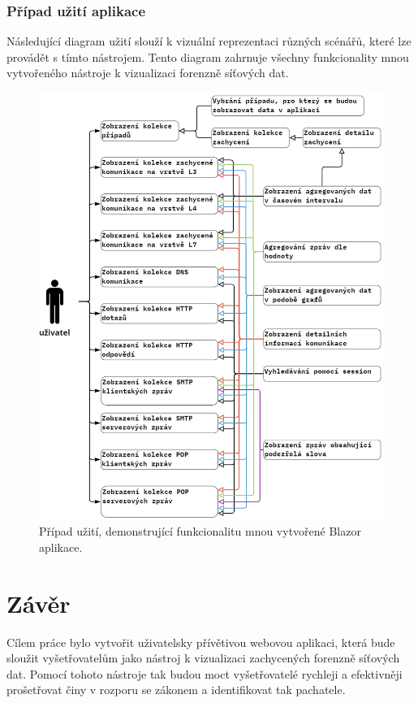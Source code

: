     \subsection{Případ užití aplikace}
        Následující diagram užití slouží k vizuální reprezentaci různých scénářů, které lze provádět s tímto nástrojem. Tento diagram zahrnuje všechny funkcionality mnou vytvořeného nástroje k vizualizaci forenzně síťových dat.
        \begin{figure}[H]
            \centering
            \includegraphics[scale=0.4]{obrazky-figures/usecases/MyApp.jpg}
            \caption{Případ užití, demonstrující funkcionalitu mnou vytvořené Blazor aplikace.}
            \label{fig:PleskalizerUseCase}
        \end{figure}

\chapter{Závěr}

Cílem práce bylo vytvořit uživatelsky přívětivou webovou aplikaci, která bude sloužit vyšetřovatelům jako nástroj k vizualizaci zachycených forenzně síťových dat. Pomocí tohoto nástroje tak budou moct vyšetřovatelé rychleji a efektivněji prošetřovat činy v rozporu se zákonem a identifikovat tak pachatele.

